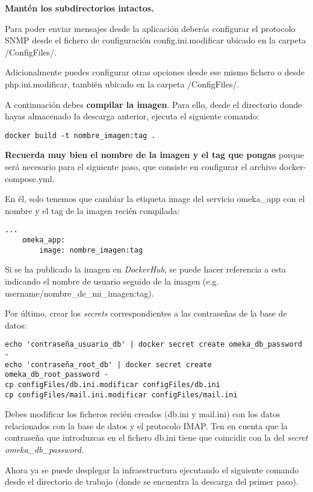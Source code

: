 \textbf{Mantén los subdirectorios intactos.}

Para poder enviar mensajes desde la aplicación deberás
configurar el protocolo SNMP desde el fichero de configuración {config.ini.modificar}
ubicado en la carpeta {/ConfigFiles/}.

Adicionalmente puedes configurar otras opciones desde ese mismo fichero o
desde {php.ini.modificar}, también ubicado en la carpeta {/ConfigFiles/}.

A continuación debes \textbf{compilar la imagen}. Para ello, desde el
directorio donde hayas almacenado la descarga anterior, ejecuta el
siguiente comando:

\begin{verbatim}
docker build -t nombre_imagen:tag .
\end{verbatim}

\textbf{Recuerda muy bien el nombre de la imagen y el tag que pongas}
porque será necesario para el siguiente paso, que consiste en configurar
el archivo {docker-compose.yml}.

En él, solo tenemos que cambiar la etiqueta {image} del servicio
{omeka\_app} con el nombre y el tag de la imagen recién compilada:

\begin{verbatim}
...
    omeka_app:
        image: nombre_imagen:tag
\end{verbatim} 

Si se ha publicado la imagen en \emph{DockerHub}, se puede hacer
referencia a esta indicando el nombre de usuario seguido de la imagen
(e.g. username/nombre\_de\_mi\_imagen:tag).

Por último, crear los \emph{secrets} correspondientes a las contraseñas
de la base de datos:

\begin{verbatim}
echo 'contraseña_usuario_db' | docker secret create omeka_db_password -
echo 'contraseña_root_db' | docker secret create omeka_db_root_password -
cp configFiles/db.ini.modificar configFiles/db.ini
cp configFiles/mail.ini.modificar configFiles/mail.ini
\end{verbatim} 

Debes modificar los ficheros recién creados ({db.ini} y {mail.ini}) con los datos relacionados
con la base de datos y el protocolo IMAP. Ten en cuenta que la contraseña que introduzcas en el
fichero {db.ini} tiene que coincidir con la del \emph{secret omeka\_db\_password}.

Ahora ya se puede desplegar la infraestructura ejecutando el siguiente
comando desde el directorio de trabajo (donde se encuentra la descarga
del primer paso).

